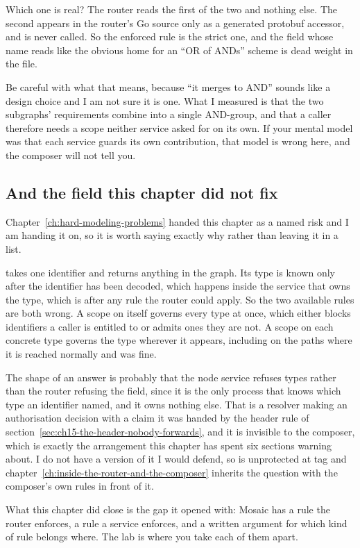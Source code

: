Which one is real? The router reads the first of the two and nothing else. The
second appears in the router's Go source only as a generated protobuf
accessor, and is never called. So the enforced rule is the strict one, and the
field whose name reads like the obvious home for an \enquote{OR of ANDs}
scheme is dead weight in the file.

Be careful with what that means, because \enquote{it merges to AND} sounds
like a design choice and I am not sure it is one. What I measured is that the two subgraphs' requirements combine into a
single AND-group, and that a caller therefore needs a scope neither service
asked for on its own. If your mental model was that each service guards its own
contribution, that model is wrong here, and the composer will not tell you.

\subsection*{And the field this chapter did not fix}

%
Chapter~\ref{ch:hard-modeling-problems} handed this chapter 
as a named risk and I am handing it on, so it is worth saying exactly why
rather than leaving it in a list.

 takes one identifier and returns anything in the graph. Its type is
known only after the identifier has been decoded, which happens inside the
service that owns the type, which is after any rule the router could apply.
So the two available rules are both wrong. A scope on  itself
governs every type at once, which either blocks identifiers a caller is
entitled to or admits ones they are not. A scope on each concrete type governs
the type wherever it appears, including on the paths where it is reached
normally and was fine.

The shape of an answer is probably that the node service refuses types rather
than the router refusing the field, since it is the only process that knows
which type an identifier named, and it owns nothing else. That is a resolver
making an authorisation decision with a claim it was handed by the header rule
of section~\ref{sec:ch15-the-header-nobody-forwards}, and it is invisible to
the composer, which is exactly the arrangement this chapter has spent six
sections warning about. I do not have a version of it I would defend, so
 is unprotected at tag  and
chapter~\ref{ch:inside-the-router-and-the-composer} inherits the question with
the composer's own rules in front of it.

\medskip

What this chapter did close is the gap it opened with: Mosaic has a rule the
router enforces, a rule a service enforces, and a written argument for which
kind of rule belongs where. The lab is where you take each of them apart.

%
